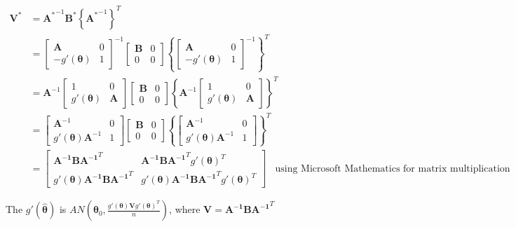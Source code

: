 \documentclass[
  letterpaper,
  DIV=11,
  numbers=noendperiod]{scrreprt}
\begin{document}
\[\begin{aligned}
\mathbf V^* &= {\mathbf A^*}^{-1}\mathbf B^* \left\{{\mathbf A^*}^{-1}\right\}^T \\
&= \begin{bmatrix} \mathbf A & 0 \\ -g'(\boldsymbol \theta) & 1\end{bmatrix}^{-1}
\begin{bmatrix} \mathbf B & 0 \\ 0 & 0 \end{bmatrix}
\left\{\begin{bmatrix} \mathbf A & 0 \\ -g'(\boldsymbol \theta) & 1\end{bmatrix}^{-1}\right\}^T \\
&= \mathbf A^{-1}\begin{bmatrix} 1 & 0 \\  g'(\boldsymbol \theta)& \mathbf A\end{bmatrix}
\begin{bmatrix} \mathbf B & 0 \\ 0 & 0 \end{bmatrix}
\left\{\mathbf A^{-1}\begin{bmatrix} 1 & 0\\  g'(\boldsymbol \theta)& \mathbf A\end{bmatrix}\right\}^T \\
&= \begin{bmatrix} \mathbf A^{-1} & 0\\  g'(\boldsymbol \theta)\mathbf A^{-1}& 1\end{bmatrix}
\begin{bmatrix} \mathbf B & 0 \\ 0 & 0 \end{bmatrix}
\left\{\begin{bmatrix} \mathbf A^{-1} & 0\\  g'(\boldsymbol \theta)\mathbf A^{-1}& 1\end{bmatrix}\right\}^T \\
&= \begin{bmatrix} \mathbf {A^{-1}BA^{-1}}^T & \mathbf {A^{-1}BA^{-1}}^T g'(\boldsymbol \theta)^T \\
g'(\boldsymbol \theta)\mathbf {A^{-1}BA^{-1}}^T  & g'(\boldsymbol \theta) \mathbf {A^{-1}BA^{-1}}^T g'(\boldsymbol \theta)^T\end{bmatrix} ~~~~\text{using Microsoft Mathematics for matrix multiplication}
\end{aligned}\]

The \(g'(\hat {\boldsymbol \theta})\) is
\(AN \left( \boldsymbol \theta_0, \frac{g'(\boldsymbol \theta)\mathbf V g'(\boldsymbol \theta)^T } n \right)\),
where \(\mathbf V = \mathbf {A^{-1}BA^{-1}}^T\)
\end{document}
